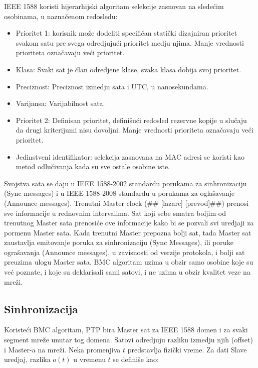 \documentclass[a4paper,12pt, master]{etf}
\begin{document}
	IEEE 1588 koristi hijerarhijski algoritam selekcije zasnovan na slede\'{c}im osobinama, u
	nazna\v{c}enom redosledu:

        \begin{itemize}
            \item Prioritet 1: korisnik mo\v{z}e dodeliti specifi\v{c}an stati\v{c}ki dizajniran prioritet
            svakom satu pre	svega odredjuju\'{c}i prioritet medju njima. Manje vrednosti prioriteta
            ozna\v{c}avaju ve\'{c}i prioritet.
                \item Klasa: Svaki sat je \v{c}lan odredjene klase, svaka klasa dobija svoj prioritet.
                \item Preciznost: Preciznost izmedju sata i UTC, u nanosekundama.
                \item Varijansa: Varijabilnost sata.
            \item Prioritet 2: Definisan prioritet, defini\v{s}u\'{c}i redosled rezervne kopije u slu\v{c}aju
            da drugi kriterijumi nisu dovoljni. Manje vrednosti prioriteta ozna\v{c}avaju ve\'{c}i prioritet.
                \item Jedinstveni identifikator: selekcija zasnovana na MAC adresi se koristi kao metod
                odlu\v{c}ivanja	kada su sve ostale osobine iste.
        \end{itemize}

        Svojstva sata se daju u IEEE 1588-2002 standardu porukama za sinhronizaciju (Sync messages) i u
        IEEE 1588-2008 standardu u porukama za ogla\v{s}avanje (Announce messages). Trenutni Master clock (\#\#
	[lazarc] [prevod]\#\#) prenosi sve informacije u rednovnim intervalima. Sat koji sebe
	smatra boljim od trenutnog Master sata prenosi\'{c}e ove informacije kako bi se pozvali svi
	uredjaji za pormenu	Master sata. Kada trenutni Master prepozna bolji sat, tada Master sat
	zaustavlja emitovanje poruka za sinhronizaciju (Sync Messages), ili poruke ogra\v{s}avanja
	(Announce messages), u zavisnosti od verzije protokola, i bolji sat preuzima ulogu Master
	sata. BMC algoritam uzima u obzir samo osobine koje su ve\'{c} poznate, i koje su deklarisali
	sami satovi, i ne uzima u obzir	kvalitet veze na mre\v{z}i.

	\subsection{Sinhronizacija}

	Koriste\'{c}i BMC algoritam, PTP bira Master sat za IEEE 1588 domen i za svaki segment mre\v{z}e
        unutar tog domena. Satovi odredjuju razliku izmedju njih (offset) i Master-a na mre\v{z}i. Neka
        promenjiva $t$ predstavlja fizi\v{c}ki vreme. Za dati Slave uredjaj, razlika $o(t)$ u vremenu $t$
        se defini\v{s}e kao:
\end{document}
